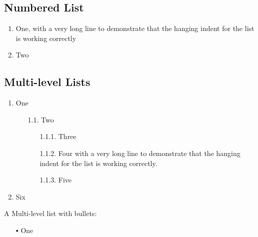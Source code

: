 \documentclass[\officeparserdriver 12pt]{article}
\begin{document}
\subsection[{Numbered List}]{\protect\textcolor{hex4F81BD}{Numbered List}}\label{numbered-list}

\begin{enumerate}
\item One, with a very long line to demonstrate that the hanging indent for the list is working correctly
\item Two
\end{enumerate}

\subsection[{Multi-level Lists}]{\protect\textcolor{hex4F81BD}{Multi-level Lists}}\label{multi-level-lists}

\begin{enumerate}
\item One
\end{enumerate}

\begin{itemize}
\item[]
\begin{enumerate}
\item[{1.1.}] Two
\end{enumerate}
\end{itemize}

\begin{itemize}
\item[]
\begin{itemize}
\item[]
\begin{enumerate}
\item[{1.1.1.}] Three
\item[{1.1.2.}] Four with a very long line to demonstrate that the hanging indent for the list is working correctly.
\item[{1.1.3.}] Five
\end{enumerate}
\end{itemize}
\end{itemize}

\begin{enumerate}
\setcounter{enumi}{1}
\item Six
\end{enumerate}

A Multi-level list with bullets:

\begin{itemize}
\item[{▪}] One
\end{itemize}
\end{document}
